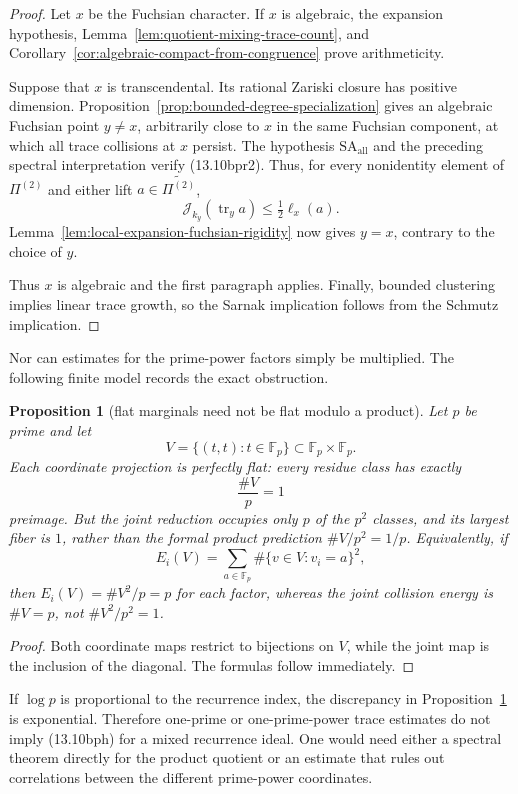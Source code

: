 \documentclass[11pt,reqno]{amsart}
\newtheorem{proposition}[theorem]{Proposition}
\theoremstyle{definition}
\theoremstyle{remark}
\newcommand{\F}{\mathbb F}
\newcommand{\Tr}{\operatorname{tr}}
\begin{document}
\begin{proof}
Let \(x\) be the Fuchsian character.  If \(x\) is algebraic, the expansion
hypothesis, Lemma~\ref{lem:quotient-mixing-trace-count}, and
Corollary~\ref{cor:algebraic-compact-from-congruence} prove arithmeticity.

Suppose that \(x\) is transcendental.  Its rational Zariski closure has
positive dimension.  Proposition~\ref{prop:bounded-degree-specialization}
gives an algebraic Fuchsian point \(y\ne x\), arbitrarily close to \(x\)
in the same Fuchsian component, at which all trace collisions at \(x\)
persist.  The hypothesis \(\mathrm{SA}_{\mathrm{all}}\)
and the preceding spectral interpretation verify (13.10bpr2).  Thus, for
every nonidentity element of \(\Pi^{(2)}\) and either lift
\(a\in\widetilde{\Pi^{(2)}}\),
\[
 \mathcal J_{k_y}(\Tr_ya)
 \le\tfrac12\ell_x(a).
\tag{13.10bpr8}
\]
Lemma~\ref{lem:local-expansion-fuchsian-rigidity} now gives \(y=x\),
contrary to the choice of \(y\).

Thus \(x\) is algebraic and the first paragraph applies.  Finally, bounded
clustering implies linear trace growth, so the Sarnak implication follows
from the Schmutz implication.
\end{proof}

Nor can estimates for the prime-power factors simply be multiplied.  The
following finite model records the exact obstruction.

\begin{proposition}[flat marginals need not be flat modulo a product]
\label{prop:crt-diagonal-obstruction}
Let \(p\) be prime and let
\[
 V=\{(t,t):t\in\F_p\}\subset\F_p\times\F_p.
\]
Each coordinate projection is perfectly flat: every residue class has
exactly
\[
 \frac{\#V}{p}=1
\]
preimage.  But the joint reduction occupies only \(p\) of the \(p^2\)
classes, and its largest fiber is \(1\), rather than the formal product
prediction \(\#V/p^2=1/p\).  Equivalently, if
\[
 E_i(V)=\sum_{a\in\F_p}\#\{v\in V:v_i=a\}^2,
\]
then \(E_i(V)=\#V^2/p=p\) for each factor, whereas the joint collision
energy is \(\#V=p\), not \(\#V^2/p^2=1\).
\end{proposition}

\begin{proof}
Both coordinate maps restrict to bijections on \(V\), while the joint map is
the inclusion of the diagonal.  The formulas follow immediately.
\end{proof}

If \(\log p\) is proportional to the recurrence index, the discrepancy in
Proposition~\ref{prop:crt-diagonal-obstruction} is exponential.  Therefore
one-prime or one-prime-power trace estimates do not imply (13.10bph) for a
mixed recurrence ideal.  One would need either a spectral theorem directly
for the product quotient or an estimate that rules out correlations between
the different prime-power coordinates.
\end{document}
